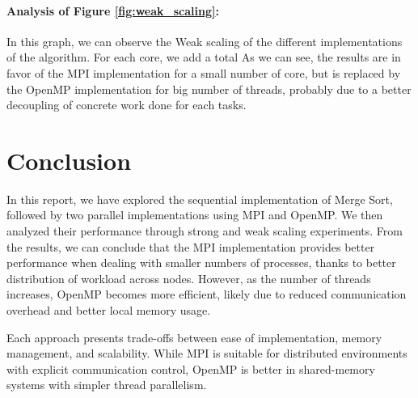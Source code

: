 \documentclass[12pt]{article}
\begin{document}
\paragraph{Analysis of Figure \ref{fig:weak_scaling}:}
In this graph, we can observe the Weak scaling of the different implementations of the algorithm. For each core, we add a total 
As we can see, the results are in favor of the MPI implementation for a small number of core, but is replaced by the OpenMP implementation for big number of threads, probably due to a better decoupling of concrete work done for each tasks.

\section{Conclusion}

In this report, we have explored the sequential implementation of Merge Sort, followed by two parallel implementations using MPI and OpenMP. We then analyzed their performance through strong and weak scaling experiments. From the results, we can conclude that the MPI implementation provides better performance when dealing with smaller numbers of processes, thanks to better distribution of workload across nodes. However, as the number of threads increases, OpenMP becomes more efficient, likely due to reduced communication overhead and better local memory usage.

Each approach presents trade-offs between ease of implementation, memory management, and scalability. While MPI is suitable for distributed environments with explicit communication control, OpenMP is better in shared-memory systems with simpler thread parallelism.
\end{document}
